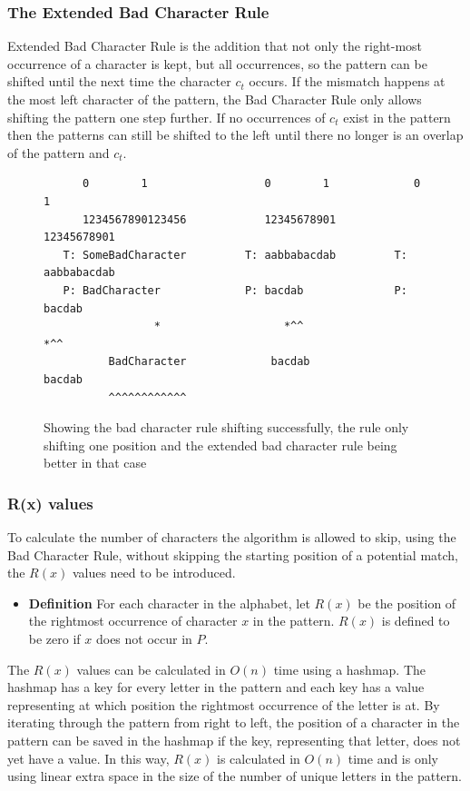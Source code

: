 \subsubsection{The Extended Bad Character Rule}
Extended Bad Character Rule is the addition that not only the right-most occurrence of a character is kept, but all occurrences, so the pattern can be shifted until the next time the character $c_t$ occurs. If the mismatch happens at the most left character of the pattern, the Bad Character Rule only allows shifting the pattern one step further.  If no occurrences of $c_t$ exist in the pattern then the patterns can still be shifted to the left until there no longer is an overlap of the pattern and $c_t$. 

\begin{figure}[t]
\begin{verbatim}
      0        1                  0        1             0        1      
      1234567890123456            12345678901            12345678901
   T: SomeBadCharacter         T: aabbabacdab         T: aabbabacdab
   P: BadCharacter             P: bacdab              P: bacdab          
                 *                   *^^                    *^^     
          BadCharacter             bacdab                   bacdab  
          ^^^^^^^^^^^^                                              
\end{verbatim}
\caption{Showing the bad character rule shifting successfully, the rule only shifting one position and the extended bad character rule being better in that case}
\label{fig:badcharacterrule_example}
\end{figure}

\subsubsection{R(x) values}
To calculate the number of characters the algorithm is allowed to skip, using the Bad Character Rule, without skipping the starting position of a potential match, the $R(x)$ values need to be introduced. 

\begin{itemize}
    \item[] \textbf{Definition} For each character in the alphabet, let $R(x)$ be the position of the rightmost occurrence of character $x$ in the pattern. $R(x)$ is defined to be zero if $x$ does not occur in $P$.
\end{itemize}

The $R(x)$ values can be calculated in $O(n)$ time using a hashmap. The hashmap has a key for every letter in the pattern and each key has a value representing at which position the rightmost occurrence of the letter is at. By iterating through the pattern from right to left, the position of a character in the pattern can be saved in the hashmap if the key, representing that letter, does not yet have a value. In this way, $R(x)$ is calculated in $O(n)$ time and is only using linear extra space in the size of the number of unique letters in the pattern.

